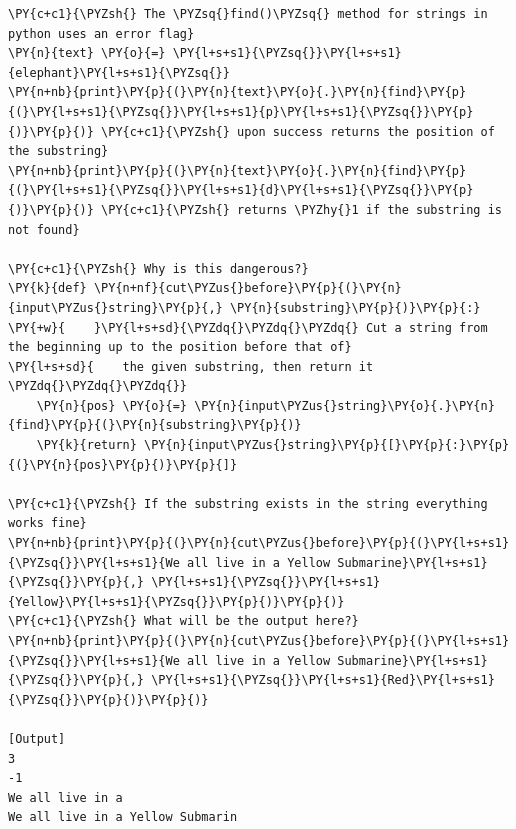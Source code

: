 \begin{Verbatim}[label=\makebox{\url{https://github.com/lucabaldini/cmepda/tree/master/slides/latex/snippets/error\_flags.py}},commandchars=\\\{\}]
\PY{c+c1}{\PYZsh{} The \PYZsq{}find()\PYZsq{} method for strings in python uses an error flag}
\PY{n}{text} \PY{o}{=} \PY{l+s+s1}{\PYZsq{}}\PY{l+s+s1}{elephant}\PY{l+s+s1}{\PYZsq{}}
\PY{n+nb}{print}\PY{p}{(}\PY{n}{text}\PY{o}{.}\PY{n}{find}\PY{p}{(}\PY{l+s+s1}{\PYZsq{}}\PY{l+s+s1}{p}\PY{l+s+s1}{\PYZsq{}}\PY{p}{)}\PY{p}{)} \PY{c+c1}{\PYZsh{} upon success returns the position of the substring}
\PY{n+nb}{print}\PY{p}{(}\PY{n}{text}\PY{o}{.}\PY{n}{find}\PY{p}{(}\PY{l+s+s1}{\PYZsq{}}\PY{l+s+s1}{d}\PY{l+s+s1}{\PYZsq{}}\PY{p}{)}\PY{p}{)} \PY{c+c1}{\PYZsh{} returns \PYZhy{}1 if the substring is not found}

\PY{c+c1}{\PYZsh{} Why is this dangerous?}
\PY{k}{def} \PY{n+nf}{cut\PYZus{}before}\PY{p}{(}\PY{n}{input\PYZus{}string}\PY{p}{,} \PY{n}{substring}\PY{p}{)}\PY{p}{:}
\PY{+w}{    }\PY{l+s+sd}{\PYZdq{}\PYZdq{}\PYZdq{} Cut a string from the beginning up to the position before that of}
\PY{l+s+sd}{    the given substring, then return it \PYZdq{}\PYZdq{}\PYZdq{}}
    \PY{n}{pos} \PY{o}{=} \PY{n}{input\PYZus{}string}\PY{o}{.}\PY{n}{find}\PY{p}{(}\PY{n}{substring}\PY{p}{)}
    \PY{k}{return} \PY{n}{input\PYZus{}string}\PY{p}{[}\PY{p}{:}\PY{p}{(}\PY{n}{pos}\PY{p}{)}\PY{p}{]}

\PY{c+c1}{\PYZsh{} If the substring exists in the string everything works fine}
\PY{n+nb}{print}\PY{p}{(}\PY{n}{cut\PYZus{}before}\PY{p}{(}\PY{l+s+s1}{\PYZsq{}}\PY{l+s+s1}{We all live in a Yellow Submarine}\PY{l+s+s1}{\PYZsq{}}\PY{p}{,} \PY{l+s+s1}{\PYZsq{}}\PY{l+s+s1}{Yellow}\PY{l+s+s1}{\PYZsq{}}\PY{p}{)}\PY{p}{)}
\PY{c+c1}{\PYZsh{} What will be the output here?}
\PY{n+nb}{print}\PY{p}{(}\PY{n}{cut\PYZus{}before}\PY{p}{(}\PY{l+s+s1}{\PYZsq{}}\PY{l+s+s1}{We all live in a Yellow Submarine}\PY{l+s+s1}{\PYZsq{}}\PY{p}{,} \PY{l+s+s1}{\PYZsq{}}\PY{l+s+s1}{Red}\PY{l+s+s1}{\PYZsq{}}\PY{p}{)}\PY{p}{)}

[Output]
3
-1
We all live in a 
We all live in a Yellow Submarin
\end{Verbatim}